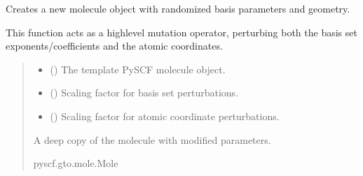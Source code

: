 \documentclass[letterpaper,10pt,english]{sphinxmanual}
\begin{document}
\begin{fulllineitems}
\label{\detokenize{api:MSTOOptpar.dmol}}
\pysigstartsignatures
\pysiglinewithargsret
{}
{\sphinxparamcomma {}\sphinxparamcomma {}}
{}
\pysigstopsignatures
\sphinxAtStartPar
Creates a new molecule object with randomized basis parameters and geometry.

\sphinxAtStartPar
This function acts as a high\sphinxhyphen{}level mutation operator, perturbing both
the basis set exponents/coefficients and the atomic coordinates.
\begin{quote}\begin{description}
\begin{itemize}
\item {} 
\sphinxAtStartPar
{} () \textendash{} The template PySCF molecule object.

\item {} 
\sphinxAtStartPar
{} () \textendash{} Scaling factor for basis set perturbations.

\item {} 
\sphinxAtStartPar
{} () \textendash{} Scaling factor for atomic coordinate perturbations.

\end{itemize}

\sphinxAtStartPar
A deep copy of the molecule with modified parameters.

\sphinxAtStartPar
pyscf.gto.mole.Mole

\end{description}\end{quote}

\end{fulllineitems}

\end{document}
